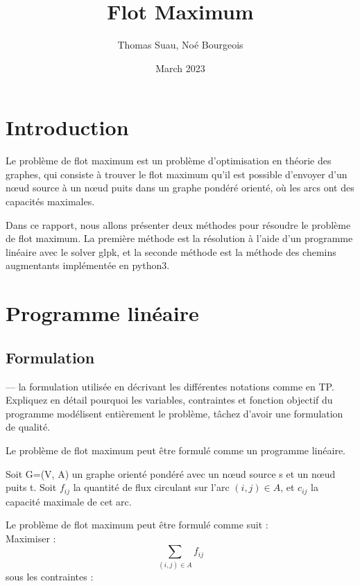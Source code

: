 \documentclass{article}
\begin{document}
\title{Flot Maximum}
\author{Thomas Suau, Noé Bourgeois }
\date{March 2023}

\maketitle

\tableofcontents
 
 \newpage

    \section{Introduction}
    Le problème de flot maximum est un problème d'optimisation en théorie des graphes,
    qui consiste à trouver le flot maximum qu'il est possible d'envoyer d'un nœud source à un nœud puits
    dans un graphe pondéré orienté,
    où les arcs ont des capacités maximales.

    Dans ce rapport, nous allons présenter deux méthodes
    pour résoudre le problème de flot maximum.
    La première méthode est la résolution à l'aide d'un programme linéaire avec le solver glpk,
    et la seconde méthode est la méthode des chemins augmentants implémentée en python3.

\section{Programme linéaire}
    
\subsection{Formulation}
       — la formulation utilisée en décrivant les différentes notations comme en TP.
       Expliquez en détail pourquoi les variables, contraintes et fonction objectif du programme modélisent entièrement le
    problème, tâchez d’avoir une formulation de qualité.

Le problème de flot maximum peut être formulé comme un programme linéaire.
       
Soit G=(V, A) un graphe orienté pondéré avec un nœud source s et un nœud puits t.
Soit $f_{ij}$ la quantité de flux circulant sur l'arc $(i,j) \in A$, et $c_{ij}$ la capacité maximale de cet arc.

Le problème de flot maximum peut être formulé comme suit : \\

Maximiser :
$$\sum_{(i,j) \in A} f_{ij}$$
sous les contraintes :
\end{document}
